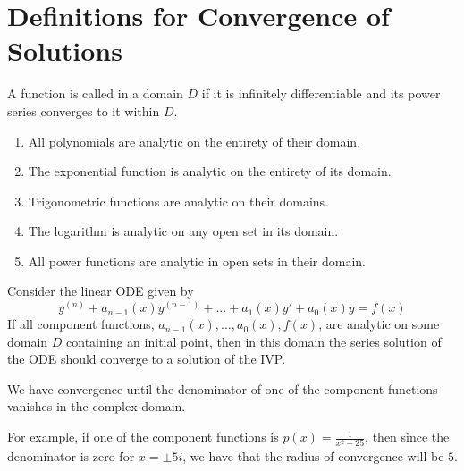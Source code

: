 \documentclass[12pt, a4paper, oneside, openright, titlepage]{book}
\begin{document}


\section{Definitions for Convergence of Solutions}

\begin{defn}[Analytic]
        A function is called  in a domain $D$ if it is infinitely differentiable and its power series converges to it within $D$.
\end{defn}




\begin{thm}
        \begin{enumerate}
                \item All polynomials are analytic on the entirety of their domain.
                \item The exponential function is analytic on the entirety of its domain.
                \item Trigonometric functions are analytic on their domains.
                \item The logarithm is analytic on any open set in its domain.
                \item All power functions are analytic in open sets in their domain.
        \end{enumerate}
\end{thm}




\begin{thm}
        Consider the linear ODE given by \begin{equation}
                y^{(n)}+a_{n-1}(x)y^{(n-1)}+...+a_1(x)y'+a_0(x)y=f(x)
        \end{equation}
        If all component functions, $a_{n-1}(x),...,a_0(x),f(x)$, are analytic on some domain $D$ containing an initial point, then in this domain the series solution of the ODE should converge to a solution of the IVP.
\end{thm}





\begin{thm}
        We have convergence until the denominator of one of the component functions vanishes in the complex domain.
\end{thm}
\begin{eg}
        For example, if one of the component functions is $p(x) = \frac{1}{x^2+25}$, then since the denominator is zero for $x = \pm 5i$, we have that the radius of convergence will be $5$.
\end{eg}
\end{document}
